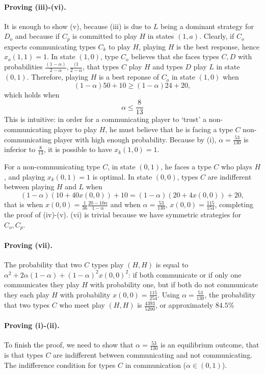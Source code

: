 \documentclass[12pt]{article}
\theoremstyle{break}
\begin{document}
\paragraph{Proving (iii)-(vi).}  It is enough to show (v), because (iii) is due to $L$ being a dominant strategy  for $D_o$ and because if $C_p$ is committed to play $H$ in states $(1,a)$. Clearly, if $C_o$ expects communicating types $C_k$ to play $H$, playing $H$ is the best response, hence $x_o(1,1)=1$. In state $(1,0)$, type $C_o$ believes that she faces types $C,D$ with probabilities $\frac{(1-\alpha)}{2-\alpha},\frac{(1}{2-\alpha}$, that types $C$ play $H$ and types $D$ play $L$ in state $(0,1)$. Therefore, playing $H$ is a best reponse of $C_o$ in state $(1,0)$ when
%
\[
(1-\alpha)50+10\geq (1-\alpha)24+20,
\]
%
which holds when 
%
\begin{equation}\label{cond-FC-H-10}
	\alpha\leq \frac{8}{13}
\end{equation}
%
This is intuitive: in order for a communicating player to `trust' a non-communicating player to play $H$, he must believe that he is facing a type $C$ non-communicating player with high enough probability. Because by (i), $\alpha=\frac{53}{130}$ is inferior to $\frac{8}{13}$, it is possible to have $x_k(1,0)=1$. 

For a non-communicating type $C$, in state $(0,1)$, he faces a type $C$ who plays $H$, and playing $x_k(0,1)=1$ is optimal. In state $(0,0)$, types $C$ are indifferent between playing $H$ and $L$ when 
%
\[
(1-\alpha)(10+40 x(0,0))+10=(1-\alpha)(20+4x(0,0))+20,
\]
%
that is when $x(0,0)=\frac{1}{36}\frac{20-10\alpha}{1-\alpha}$ and when $\alpha=\frac{53}{130}$, $x(0,0)=\frac{115}{154}$, completing the proof of (iv)-(v). (vi) is trivial because we have symmetric strategies for $C_o,C_p$. 

\paragraph{Proving (vii).}	The probability that two $C$ types play $(H,H)$ is equal to $\alpha^2+2\alpha(1-\alpha)+(1-\alpha)^2 x(0,0)^2$: if both communicate or if only one communicates they play $H$ with probability one, but if both do not communicate they each play $H$ with probability $x(0,0)=\frac{115}{254}$. Using $\alpha=\frac{53}{130}$, the probability that two types $C$ who meet play $(H,H)$ is $\frac{4393}{5200}$, or approximately $84.5\%$



\paragraph{Proving (i)-(ii).} To finish the proof, we need to show that $\alpha=\frac{53}{130}$ is an equilibrium outcome, that is that types $C$ are indifferent between communicating and not communicating. The indifference condition for types $C$ in communication ($\alpha\in(0,1)$).
\end{document}
